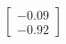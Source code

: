 \documentclass[preview]{standalone}
\begin{document}
\begin{align*}
\begin{bmatrix} -0.09 \\ -0.92 \end{bmatrix}
\end{align*}
\end{document}
